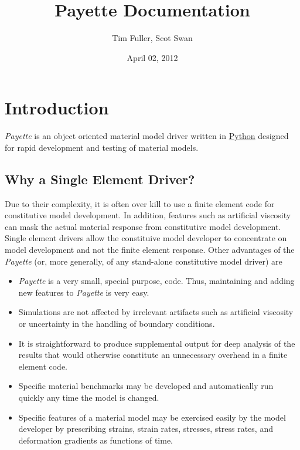 \documentclass[letterpaper,10pt,english]{sphinxmanual}
\title{Payette Documentation}
\date{April 02, 2012}
\author{Tim Fuller, Scot Swan}
\begin{document}
\maketitle
\tableofcontents
{}\label{index::doc}



\chapter{Introduction}
\label{Files/introduction:introduction}\label{Files/introduction::doc}\label{Files/introduction:payette-material-model-driver-official-documentation}
\emph{Payette} is an object oriented material model driver written in \href{http://www.python.org}{Python} designed for rapid development and testing of material
models.


\section{Why a Single Element Driver?}
\label{Files/introduction:why-a-single-element-driver}
Due to their complexity, it is often over kill to use a finite element code for
constitutive model development. In addition, features such as artificial
viscosity can mask the actual material response from constitutive model
development. Single element drivers allow the constituive model developer to
concentrate on model development and not the finite element response. Other
advantages of the \emph{Payette} (or, more generally, of any stand-alone constitutive
model driver) are
\begin{itemize}
\item {} 
\emph{Payette} is a very small, special purpose, code. Thus, maintaining and
adding new features to \emph{Payette} is very easy.

\item {} 
Simulations are not affected by irrelevant artifacts such as artificial
viscosity or uncertainty in the handling of boundary conditions.

\item {} 
It is straightforward to produce supplemental output for deep analysis of the
results that would otherwise constitute an unnecessary overhead in a finite
element code.

\item {} 
Specific material benchmarks may be developed and automatically run quickly
any time the model is changed.

\item {} 
Specific features of a material model may be exercised easily by the model
developer by prescribing strains, strain rates, stresses, stress rates, and
deformation gradients as functions of time.

\end{itemize}
\end{document}

